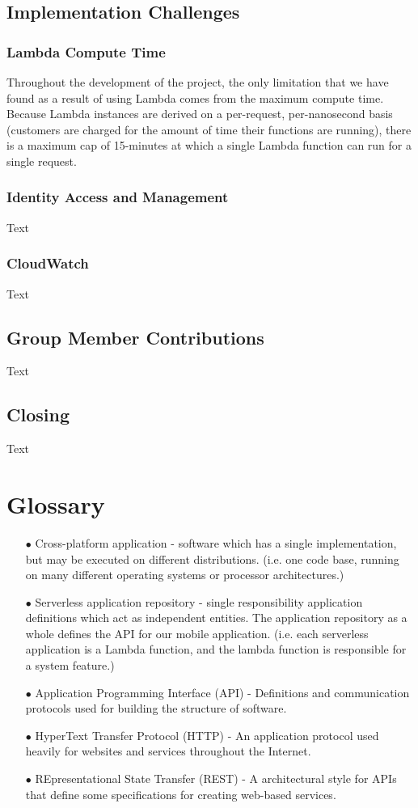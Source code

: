 \documentclass[10pt, a4paper]{article}
\begin{document}
\subsection{Implementation Challenges}
\subsubsection{Lambda Compute Time}
Throughout the development of the project, the only limitation that we have found as a result of using Lambda comes from the maximum compute time. Because Lambda instances are derived on a per-request, per-nanosecond basis (customers are charged for the amount of time their functions are running), there is a maximum cap of 15-minutes at which a single Lambda function can run for a single request.
\subsubsection{Identity Access and Management}
Text
\subsubsection{CloudWatch}
Text

\subsection{Group Member Contributions}
Text

\subsection{Closing}
Text


\section{Glossary}
\begin{enumerate}
	\item[$\bullet$] Cross-platform application - software which has a single implementation, but may be executed on different distributions. (i.e. one code base, running on many different operating systems or processor architectures.)
	\item[$\bullet$] Serverless application repository - single responsibility application definitions which act as independent entities. The application repository as a whole defines the API for our mobile application. (i.e. each serverless application is a Lambda function, and the lambda function is responsible for a system feature.)
	\item[$\bullet$] Application Programming Interface (API) - Definitions and communication protocols used for building the structure of software.
	\item[$\bullet$] HyperText Transfer Protocol (HTTP) - An application protocol used heavily for websites and services throughout the Internet.
	\item[$\bullet$] REpresentational State Transfer (REST) - A architectural style for APIs that define some specifications for creating web-based services.
\end{enumerate}
\end{document}

